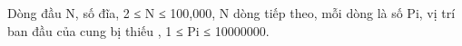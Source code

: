 Dòng đầu N, số đĩa, 2 ≤ N ≤ 100,000,  N dòng tiếp theo, mỗi dòng là số Pi, vị trí ban đầu của cung bị thiếu , 1 ≤ Pi ≤ 10000000.  

\